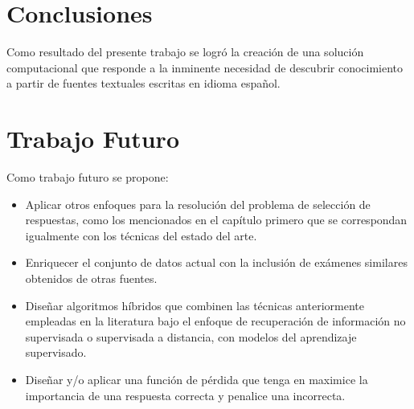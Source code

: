 \chapter*{Conclusiones}\label{chapter:conclusion}

Como resultado del presente trabajo se logró la creación de una solución computacional que responde a la inminente necesidad de descubrir conocimiento a partir de fuentes textuales escritas en idioma español.


\chapter*{Trabajo Futuro}\label{chapter:recomendation}

Como trabajo futuro se propone:

\begin{itemize}
	\item Aplicar otros enfoques para la resolución del problema de selección de respuestas, como los mencionados en el capítulo primero que se correspondan igualmente con los técnicas del estado del arte.
    \item Enriquecer el conjunto de datos actual con la inclusión de exámenes similares obtenidos de otras fuentes. 
    \item Diseñar algoritmos híbridos que combinen las técnicas anteriormente empleadas en la literatura bajo el enfoque de recuperación de información no supervisada o supervisada a distancia, con modelos del aprendizaje supervisado.
    \item Diseñar y/o aplicar una función de pérdida que tenga en maximice la importancia de una respuesta correcta y penalice una incorrecta.
\end{itemize}
